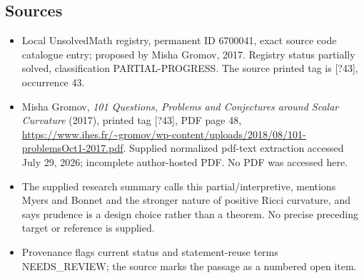 \documentclass[11pt]{article}
\begin{document}
\subsection{Sources}
\begin{itemize}
\item Local UnsolvedMath registry, permanent ID 6700041, exact source code catalogue entry; proposed by Misha Gromov, 2017. Registry status partially solved, classification PARTIAL-PROGRESS. The source printed tag is [?43], occurrence 43.
\item Misha Gromov, \emph{101 Questions, Problems and Conjectures around Scalar Curvature} (2017), printed tag [?43], PDF page 48, \url{https://www.ihes.fr/~gromov/wp-content/uploads/2018/08/101-problemsOct1-2017.pdf}. Supplied normalized pdf-text extraction accessed July 29, 2026; incomplete author-hosted PDF. No PDF was accessed here.
\item The supplied research summary calls this partial/interpretive, mentions Myers and Bonnet and the stronger nature of positive Ricci curvature, and says prudence is a design choice rather than a theorem. No precise preceding target or reference is supplied.
\item Provenance flags current status and statement-reuse terms NEEDS\_REVIEW; the source marks the passage as a numbered open item.
\end{itemize}
\end{document}
